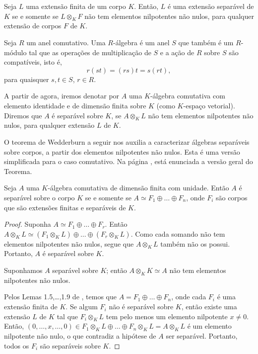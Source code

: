 \begin{corol} \label{corol:nilp}
Seja $L$ uma extensão finita de um corpo $K$. Então, $L$ é uma extensão separável de $K$ se e somente se $L\otimes_K F$ não tem elementos nilpotentes não nulos, para qualquer extensão de corpos $F$ de $K$.
\end{corol}



\begin{defn}
Seja $R$ um anel comutativo. Uma $R$-álgebra é um anel $S$ que também é um $R$-módulo tal que as operações de multiplicação de $S$ e a ação de $R$ sobre $S$ são compatíveis, isto é,
\[r(st) = (rs)t = s(rt),\] para quaisquer $s, t \in S$, $r \in R$.
\end{defn}

A partir de agora, iremos denotar por $A$ uma $K$-álgebra comutativa com elemento identidade e de dimensão finita sobre $K$ (como $K$-espaço vetorial). Diremos que $A$ é separável sobre $K$, se $A\otimes_K L$ não tem elementos nilpotentes não nulos, para qualquer extensão $L$ de $K$. \par 
O teorema de Wedderburn a seguir nos auxilia a caracterizar álgebras separáveis sobre corpos, a partir dos elementos nilpotentes não nulos. Esta é uma versão simplificada para o caso comutativo. Na página \pageref{teo:wedderburn}, está enunciada a versão geral do Teorema.

\begin{teo} \label{teo:wed-comut}
Seja $A$ uma $K$-álgebra comutativa de dimensão finita com unidade. Então $A$ é separável sobre o corpo $K$ se e somente se $A \simeq F_1 \oplus \dots \oplus F_n$, onde $F_i$ são corpos que são extensões finitas e separáveis de $K$.
\begin{proof}
Suponha $A\simeq F_1 \oplus \dots \oplus F_r$. Então $A\otimes_K L \simeq \left(F_1 \otimes_K L\right) \oplus \dots \oplus \left(F_r \otimes_K L\right)$. Como cada somando não tem elementos nilpotentes não nulos, segue que $A\otimes_K L$ também não os possui. Portanto, $A$ é separável sobre $K$. \par 
Suponhamos $A$ separável sobre $K$; então $A\otimes_K K \simeq A$ não tem elementos nilpotentes não nulos. \par
Pelos Lemas 1.5,\dots,1.9 de \cite{paques}, temos que $A=F_1 \oplus \dots \oplus F_n$, onde cada $F_i$ é uma extensão finita de $K$. Se algum $F_i$ não é separável sobre $K$, então existe uma extensão $L$ de $K$ tal que $F_i\otimes_K L$ tem pelo menos um elemento nilpotente $x\neq 0$. Então, $(0,\dots,x,\dots,0) \in F_1\otimes_K L \oplus \dots \oplus F_n\otimes_K L = A\otimes_K L$ é um elemento nilpotente não nulo, o que contradiz a hipótese de $A$ ser separável. Portanto, todos os $F_i$ são separáveis sobre $K$.
\end{proof}
\end{teo}

